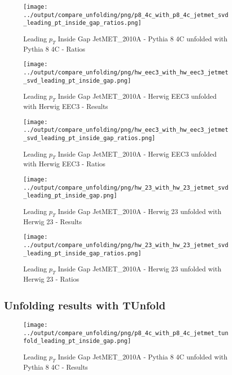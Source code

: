 \documentclass[11pt]{book}
\begin{document}
\begin{figure}[ht]
\centering
\texttt{[image: ../output/compare\_unfolding/png/p8\_4c\_with\_p8\_4c\_jetmet\_svd\_leading\_pt\_inside\_gap\_ratios.png]}
\caption{Leading $p_{T}$ Inside Gap JetMET\_2010A - Pythia 8 4C unfolded with Pythia 8 4C - Ratios}
\label{p8_p8_jetmet_svd_leading_pt_inside_gap_b}
\end{figure}

\begin{figure}[ht]
\centering
\texttt{[image: ../output/compare\_unfolding/png/hw\_eec3\_with\_hw\_eec3\_jetmet\_svd\_leading\_pt\_inside\_gap.png]}
\caption{Leading $p_{T}$ Inside Gap JetMET\_2010A - Herwig EEC3 unfolded with Herwig EEC3 - Results}
\label{hw_eec3_hw_eec3_jetmet_svd_leading_pt_inside_gap_a}
\end{figure}

\begin{figure}[ht]
\centering
\texttt{[image: ../output/compare\_unfolding/png/hw\_eec3\_with\_hw\_eec3\_jetmet\_svd\_leading\_pt\_inside\_gap\_ratios.png]}
\caption{Leading $p_{T}$ Inside Gap JetMET\_2010A - Herwig EEC3 unfolded with Herwig EEC3 - Ratios}
\label{hw_eec3_hw_eec3_jetmet_svd_leading_pt_inside_gap_b}
\end{figure}

\begin{figure}[ht]
\centering
\texttt{[image: ../output/compare\_unfolding/png/hw\_23\_with\_hw\_23\_jetmet\_svd\_leading\_pt\_inside\_gap.png]}
\caption{Leading $p_{T}$ Inside Gap JetMET\_2010A - Herwig 23 unfolded with Herwig 23 - Results}
\label{hw_23_hw_23_jetmet_svd_leading_pt_inside_gap_a}
\end{figure}

\begin{figure}[ht]
\centering
\texttt{[image: ../output/compare\_unfolding/png/hw\_23\_with\_hw\_23\_jetmet\_svd\_leading\_pt\_inside\_gap\_ratios.png]}
\caption{Leading $p_{T}$ Inside Gap JetMET\_2010A - Herwig 23 unfolded with Herwig 23 - Ratios}
\label{hw_23_hw_23_jetmet_svd_leading_pt_inside_gap_b}
\end{figure}


\clearpage
\subsection{Unfolding results with TUnfold}

\begin{figure}[ht]
\centering
\texttt{[image: ../output/compare\_unfolding/png/p8\_4c\_with\_p8\_4c\_jetmet\_tunfold\_leading\_pt\_inside\_gap.png]}
\caption{Leading $p_{T}$ Inside Gap JetMET\_2010A - Pythia 8 4C unfolded with Pythia 8 4C - Results}
\label{p8_p8_jetmet_tunfold_leading_pt_inside_gap_a}
\end{figure}
\end{document}
